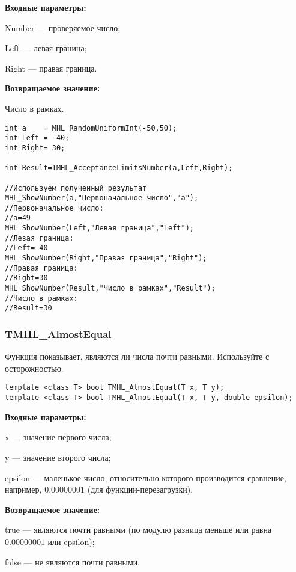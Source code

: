 \documentclass[a4paper,12pt]{article}
\begin{document}
\textbf{Входные параметры:}  
 
Number --- проверяемое число;
 
Left --- левая граница;
 
Right --- правая граница.

\textbf{Возвращаемое значение:}
 
Число в рамках.


\begin{lstlisting}[label=code_use_TMHL_AcceptanceLimitsNumber,caption=Пример использования]
int a    = MHL_RandomUniformInt(-50,50);
int Left = -40;
int Right= 30;

int Result=TMHL_AcceptanceLimitsNumber(a,Left,Right);

//Используем полученный результат
MHL_ShowNumber(a,"Первоначальное число","a");
//Первоначальное число:
//a=49
MHL_ShowNumber(Left,"Левая граница","Left");
//Левая граница:
//Left=-40
MHL_ShowNumber(Right,"Правая граница","Right");
//Правая граница:
//Right=30
MHL_ShowNumber(Result,"Число в рамках","Result");
//Число в рамках:
//Result=30
\end{lstlisting}

\subsubsection{TMHL\_AlmostEqual}\label{TMHL_AlmostEqual}

Функция показывает, являются ли числа почти равными. Используйте с осторожностью.


\begin{lstlisting}[label=code_syntax_TMHL_AlmostEqual,caption=Синтаксис]
template <class T> bool TMHL_AlmostEqual(T x, T y);
template <class T> bool TMHL_AlmostEqual(T x, T y, double epsilon);
\end{lstlisting}

\textbf{Входные параметры:}

  x --- значение первого числа;
  
 y --- значение второго числа;
	
 epsilon --- маленькое число, относительно которого производится сравнение, например, $0.00000001$ (для функции-перезагрузки).

\textbf{Возвращаемое значение:}

 true --- являются почти равными (по модулю разница меньше или равна $0.00000001$ или epsilon);
 
 false --- не являются почти равными.
\end{document}
